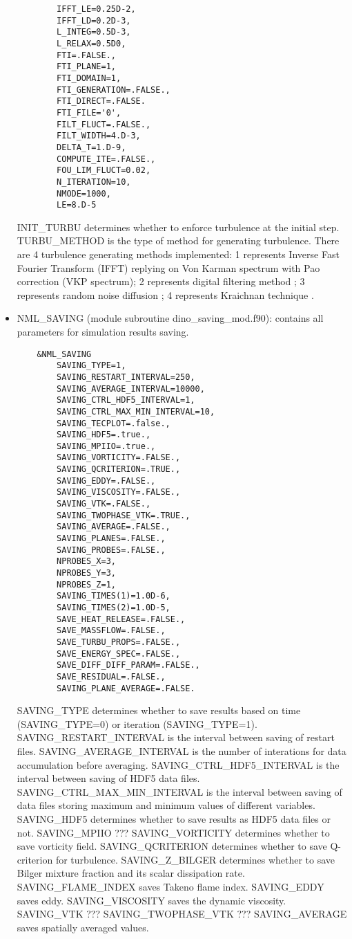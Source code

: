 \begin{itemize}
\begin{lstlisting}
        IFFT_LE=0.25D-2,
        IFFT_LD=0.2D-3,
        L_INTEG=0.5D-3,
        L_RELAX=0.5D0,
        FTI=.FALSE.,
        FTI_PLANE=1,
        FTI_DOMAIN=1,
        FTI_GENERATION=.FALSE.,
        FTI_DIRECT=.FALSE.
        FTI_FILE='0',
        FILT_FLUCT=.FALSE.,
        FILT_WIDTH=4.D-3,
        DELTA_T=1.D-9,
        COMPUTE_ITE=.FALSE.,
        FOU_LIM_FLUCT=0.02,
        N_ITERATION=10,
        NMODE=1000,
        LE=8.D-5
  \end{lstlisting}
  INIT\_TURBU determines whether to enforce turbulence at the initial step. TURBU\_METHOD is the type of method for generating turbulence. There are 4 turbulence generating methods implemented: 1 represents Inverse Fast Fourier Transform (IFFT) replying on Von Karman spectrum with Pao correction \cite{Parcomb} (VKP spectrum); 2 represents digital filtering method \cite{klein2003}; 3 represents random noise diffusion \cite{kempf2005}; 4 represents Kraichnan technique \cite{Kraichnan1970}.
  \item NML\_SAVING (module subroutine dino\_saving\_mod.f90): contains all parameters for simulation results saving.
  \begin{lstlisting}
    &NML_SAVING
        SAVING_TYPE=1,
        SAVING_RESTART_INTERVAL=250,
        SAVING_AVERAGE_INTERVAL=10000,
        SAVING_CTRL_HDF5_INTERVAL=1,
        SAVING_CTRL_MAX_MIN_INTERVAL=10,
        SAVING_TECPLOT=.false.,
        SAVING_HDF5=.true.,
        SAVING_MPIIO=.true.,
        SAVING_VORTICITY=.FALSE.,
        SAVING_QCRITERION=.TRUE.,
        SAVING_EDDY=.FALSE.,
        SAVING_VISCOSITY=.FALSE.,
        SAVING_VTK=.FALSE.,
        SAVING_TWOPHASE_VTK=.TRUE.,
        SAVING_AVERAGE=.FALSE.,
        SAVING_PLANES=.FALSE.,
        SAVING_PROBES=.FALSE.,
        NPROBES_X=3,
        NPROBES_Y=3,
        NPROBES_Z=1,
        SAVING_TIMES(1)=1.0D-6,
        SAVING_TIMES(2)=1.0D-5,
        SAVE_HEAT_RELEASE=.FALSE.,
        SAVE_MASSFLOW=.FALSE.,
        SAVE_TURBU_PROPS=.FALSE.,
        SAVE_ENERGY_SPEC=.FALSE.,
        SAVE_DIFF_DIFF_PARAM=.FALSE.,
        SAVE_RESIDUAL=.FALSE.,
        SAVING_PLANE_AVERAGE=.FALSE.
  \end{lstlisting}
  SAVING\_TYPE determines whether to save results based on time (SAVING\_TYPE=0) or iteration (SAVING\_TYPE=1). SAVING\_RESTART\_INTERVAL is the interval between saving of restart files. SAVING\_AVERAGE\_INTERVAL is the number of interations for data accumulation before averaging. SAVING\_CTRL\_HDF5\_INTERVAL is the interval between saving of HDF5 data files. SAVING\_CTRL\_MAX\_MIN\_INTERVAL is the interval between saving of data files storing maximum and minimum values of different variables. SAVING\_HDF5 determines whether to save results as HDF5 data files or not. SAVING\_MPIIO ??? SAVING\_VORTICITY determines whether to save vorticity field. SAVING\_QCRITERION determines whether to save Q-criterion for turbulence. SAVING\_Z\_BILGER determines whether to save Bilger mixture fraction and its scalar dissipation rate. SAVING\_FLAME\_INDEX saves Takeno flame index. SAVING\_EDDY saves eddy. SAVING\_VISCOSITY saves the dynamic viscosity. SAVING\_VTK ??? SAVING\_TWOPHASE\_VTK ??? SAVING\_AVERAGE saves spatially averaged values.

\end{itemize}
